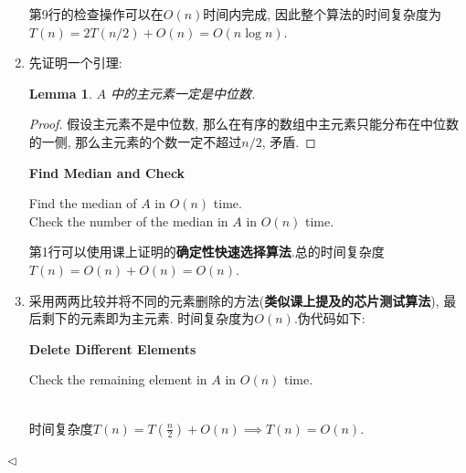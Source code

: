 \documentclass[11pt]{article}
\newtheorem{lemma}[theorem]{Lemma}
\newenvironment{answer}[1][Answer]{\begin{trivlist}
\item[\hskip \labelsep{\bfseries\itshape#1.}\hskip \labelsep]}{\hfill$\lhd$\end{trivlist}}
\begin{document}
\begin{answer}
\begin{enumerate}[label = (\arabic*)]
\begin{algorithm}
{            }
        \end{algorithm}
        第9行的检查操作可以在$O(n)$时间内完成, 因此整个算法的时间复杂度为$T(n) = 2T(n/2) + O(n) = O(n \log n)$.
    \item 先证明一个引理:
    \begin{lemma}
        $A$ 中的主元素一定是中位数.
    \end{lemma}
    \begin{proof}
        假设主元素不是中位数, 那么在有序的数组中主元素只能分布在中位数的一侧, 那么主元素的个数一定不超过$n/2$, 矛盾.
    \end{proof}
    \begin{algorithm}
        \caption{\textbf{Find Median and Check}}
        Find the median of $A$ in $O(n)$ time.\\
        Check the number of the median in $A$ in $O(n)$ time.\\
    \end{algorithm}
    第1行可以使用课上证明的\textbf{确定性快速选择算法}.总的时间复杂度$T(n) = O(n) + O(n) = O(n)$.
    \item 采用两两比较并将不同的元素删除的方法(\textbf{类似课上提及的芯片测试算法}), 最后剩下的元素即为主元素. 时间复杂度为$O(n)$.伪代码如下:
    \begin{algorithm}
        \caption{\textbf{Delete Different Elements}}
        Check the remaining element in $A$ in $O(n)$ time.\\
    \end{algorithm}
    \\时间复杂度$T(n) = T(\frac{n}{2}) + O(n) \implies T(n) = O(n)$.
    \end{enumerate}
\end{answer}
\end{document}
